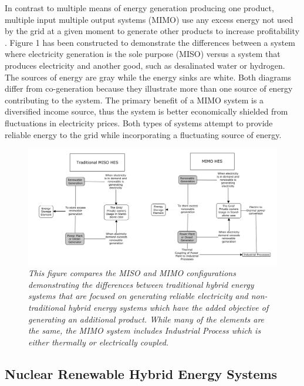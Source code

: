 \documentclass{article}                                                                           %
\begin{document}
\begin{linenumbers}
In contrast to multiple means of energy generation producing one product, multiple input multiple output systems (MIMO) use any excess energy not used by the grid at a given moment to generate other products to increase profitability \cite {Garcia2013}. Figure 1 has been constructed to demonstrate the differences between a system where electricity generation is the sole purpose (MISO) versus a system that produces electricity and another good, such as desalinated water or hydrogen. The sources of energy are gray while the energy sinks are white. Both diagrams differ from co-generation because they illustrate more than one source of energy contributing to the system. The primary benefit of a MIMO system is a diversified income source, thus the system is better economically shielded from fluctuations in electricity prices. Both types of systems attempt to provide reliable energy to the grid while incorporating a fluctuating source of energy.

\begin{figure}
\includegraphics[width=\textwidth]{MISO_MIMO.png}
\caption{\small \sl This figure compares the MISO and MIMO configurations demonstrating the differences between traditional hybrid energy systems that are focused on generating reliable electricity and non-traditional hybrid energy systems which have the added objective of generating an additional product.  While many of the elements are the same, the MIMO system includes  Industrial Process which is either thermally or electrically coupled.}
\end{figure}

\subsection{Nuclear Renewable Hybrid Energy Systems}


\end{linenumbers}
\end{document}
